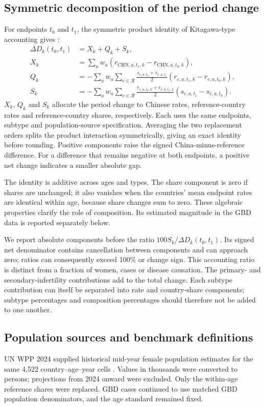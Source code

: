 \documentclass[11pt,a4paper]{article}
\begin{document}
\subsection{Symmetric decomposition of the period change}
For endpoints $t_0$ and $t_1$, the symmetric product identity of Kitagawa-type accounting gives \citep{kitagawa}:
\begin{align}
 \Delta D_k(t_0,t_1)&=X_k+Q_k+S_k,\\
 X_k&=\sum_a w_a(r_{\mathrm{CHN},a,t_1,k}-r_{\mathrm{CHN},a,t_0,k}),\\
 Q_k&=-\sum_a w_a\sum_{c\in\mathcal{R}}\frac{s_{c,a,t_0}+s_{c,a,t_1}}{2}(r_{c,a,t_1,k}-r_{c,a,t_0,k}),\\
 S_k&=-\sum_a w_a\sum_{c\in\mathcal{R}}\frac{r_{c,a,t_0,k}+r_{c,a,t_1,k}}{2}(s_{c,a,t_1}-s_{c,a,t_0}).
\end{align}
$X_k$, $Q_k$ and $S_k$ allocate the period change to Chinese rates, reference-country rates and reference-country shares, respectively. Each uses the same endpoints, subtype and population-source specification. Averaging the two replacement orders splits the product interaction symmetrically, giving an exact identity before rounding. Positive components raise the signed China-minus-reference difference. For a difference that remains negative at both endpoints, a positive net change indicates a smaller absolute gap.

The identity is additive across ages and types. The share component is zero if shares are unchanged; it also vanishes when the countries' mean endpoint rates are identical within age, because share changes sum to zero. These algebraic properties clarify the role of composition. Its estimated magnitude in the GBD data is reported separately below.

We report absolute components before the ratio $100S_k/\Delta D_k(t_0,t_1)$. Its signed net denominator contains cancellation between components and can approach zero; ratios can consequently exceed 100\% or change sign. This accounting ratio is distinct from a fraction of women, cases or disease causation. The primary- and secondary-infertility contributions add to the total change. Each subtype contribution can itself be separated into rate and country-share components; subtype percentages and composition percentages should therefore not be added to one another.

\subsection{Population sources and benchmark definitions}
UN WPP 2024 supplied historical mid-year female population estimates for the same 4,522 country--age--year cells \citep{wpp2024}. Values in thousands were converted to persons; projections from 2024 onward were excluded. Only the within-age reference shares were replaced. GBD cases continued to use matched GBD population denominators, and the age standard remained fixed.
\end{document}
